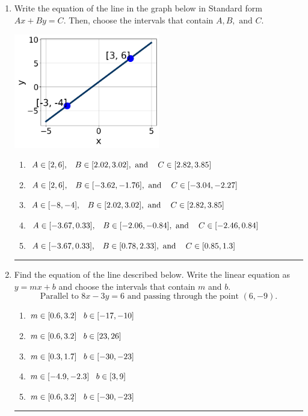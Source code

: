 \documentclass[14pt]{extbook}
\newcommand{\litem}[1]{\item#1\hspace*{-1cm}\rule{\textwidth}{0.4pt}}
\begin{document}
\begin{enumerate}
{\begin{enumerate}[label=\Alph*.]
\end{enumerate} }
\litem{
Write the equation of the line in the graph below in Standard form $Ax+By=C$. Then, choose the intervals that contain $A, B, \text{ and } C$.
\begin{center}
    \includegraphics[width=0.5\textwidth]{../Figures/linearGraphToStandardCopyC.png}
\end{center}
\begin{enumerate}[label=\Alph*.]
\item \( A \in [2, 6], \hspace{3mm} B \in [2.02, 3.02], \text{ and } \hspace{3mm} C \in [2.82, 3.85] \)
\item \( A \in [2, 6], \hspace{3mm} B \in [-3.62, -1.76], \text{ and } \hspace{3mm} C \in [-3.04, -2.27] \)
\item \( A \in [-8, -4], \hspace{3mm} B \in [2.02, 3.02], \text{ and } \hspace{3mm} C \in [2.82, 3.85] \)
\item \( A \in [-3.67, 0.33], \hspace{3mm} B \in [-2.06, -0.84], \text{ and } \hspace{3mm} C \in [-2.46, 0.84] \)
\item \( A \in [-3.67, 0.33], \hspace{3mm} B \in [0.78, 2.33], \text{ and } \hspace{3mm} C \in [0.85, 1.3] \)

\end{enumerate} }
\litem{
Find the equation of the line described below. Write the linear equation as $ y=mx+b $ and choose the intervals that contain $m$ and $b$.\[ \text{Parallel to } 8 x - 3 y = 6 \text{ and passing through the point } (6, -9). \]\begin{enumerate}[label=\Alph*.]
\item \( m \in [0.6, 3.2] \hspace*{3mm} b \in [-17, -10] \)
\item \( m \in [0.6, 3.2] \hspace*{3mm} b \in [23, 26] \)
\item \( m \in [0.3, 1.7] \hspace*{3mm} b \in [-30, -23] \)
\item \( m \in [-4.9, -2.3] \hspace*{3mm} b \in [3, 9] \)
\item \( m \in [0.6, 3.2] \hspace*{3mm} b \in [-30, -23] \)


\end{enumerate}}
\end{enumerate}
\end{document}
